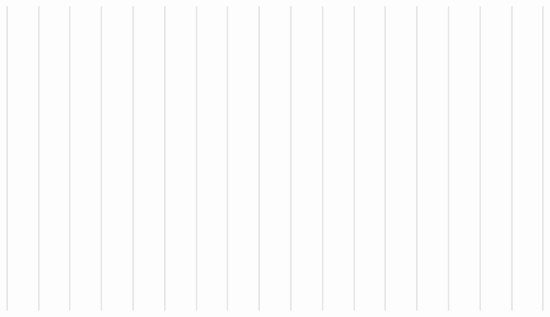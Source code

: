 \documentclass[letterpaper,10pt,english]{sphinxmanual}
\begin{document}
\begin{quote}
\begin{quote}
\begin{quote}
\begin{quote}
\begin{quote}
\begin{quote}
\begin{quote}
\begin{quote}
\begin{quote}
\begin{quote}
\begin{quote}
\begin{quote}
\begin{quote}
\begin{quote}
\begin{quote}
\begin{quote}
\begin{quote}
\begin{quote}
\begin{quote}
\begin{quote}
\begin{quote}
\begin{quote}
\begin{quote}
\begin{quote}
\begin{quote}
\begin{quote}
\begin{quote}
\begin{quote}
\begin{quote}
\begin{quote}
\begin{quote}
\begin{quote}
\begin{quote}
\begin{quote}
\begin{quote}
\begin{quote}
\begin{quote}
\begin{quote}
\begin{quote}
\begin{quote}
\begin{quote}
\begin{quote}
\begin{quote}
\begin{quote}
\begin{quote}
\begin{quote}
\begin{quote}
\begin{quote}
\begin{quote}
\begin{quote}
\begin{quote}
\begin{quote}
\begin{quote}
\begin{quote}
\begin{quote}
\begin{quote}
\begin{quote}
\begin{quote}
\begin{quote}
\begin{quote}
\begin{quote}
\begin{quote}
\begin{quote}
\begin{quote}
\begin{quote}
\begin{quote}
\begin{quote}
\begin{quote}
\begin{quote}
\begin{quote}
\begin{quote}
\begin{quote}
\begin{quote}
\begin{quote}
\begin{quote}
\begin{quote}
\begin{quote}
\begin{quote}
\begin{quote}
\begin{quote}
\begin{quote}
\begin{quote}
\begin{quote}
\begin{quote}
\begin{quote}
\begin{quote}
\begin{quote}
\begin{quote}
\begin{quote}
\begin{quote}
\begin{quote}
\begin{quote}
\begin{quote}
\begin{sphinxShadowBox}
\begin{quote}
\begin{description}
Napolitano}

\end{description}\end{quote}
\end{sphinxShadowBox}

\begin{sphinxShadowBox}
\begin{itemize}
\item {} 
\sphinxAtStartPar
<<<<<<< HEAD
\label{\detokenize{database_schema:id102}}{\hyperref[\detokenize{database_schema:overview-table}]{}}

\item {} 
\sphinxAtStartPar
{}\label{\detokenize{database_schema:id103}}{\hyperref[\detokenize{database_schema:aggressor-table}]{}}

\item {} 
\sphinxAtStartPar
{}\label{\detokenize{database_schema:id104}}{\hyperref[\detokenize{database_schema:victim-table}]{}}

\item {} 
\sphinxAtStartPar
{}\label{\detokenize{database_schema:id105}}{\hyperref[\detokenize{database_schema:human-rights-category-table}]{}}

\item {} 
\sphinxAtStartPar
{}\label{\detokenize{database_schema:id106}}{\hyperref[\detokenize{database_schema:human-rights-offense-table}]{}}

\item {} 
\end{itemize}
\end{sphinxShadowBox}
\end{quote}
\end{quote}
\end{quote}
\end{quote}
\end{quote}
\end{quote}
\end{quote}
\end{quote}
\end{quote}
\end{quote}
\end{quote}
\end{quote}
\end{quote}
\end{quote}
\end{quote}
\end{quote}
\end{quote}
\end{quote}
\end{quote}
\end{quote}
\end{quote}
\end{quote}
\end{quote}
\end{quote}
\end{quote}
\end{quote}
\end{quote}
\end{quote}
\end{quote}
\end{quote}
\end{quote}
\end{quote}
\end{quote}
\end{quote}
\end{quote}
\end{quote}
\end{quote}
\end{quote}
\end{quote}
\end{quote}
\end{quote}
\end{quote}
\end{quote}
\end{quote}
\end{quote}
\end{quote}
\end{quote}
\end{quote}
\end{quote}
\end{quote}
\end{quote}
\end{quote}
\end{quote}
\end{quote}
\end{quote}
\end{quote}
\end{quote}
\end{quote}
\end{quote}
\end{quote}
\end{quote}
\end{quote}
\end{quote}
\end{quote}
\end{quote}
\end{quote}
\end{quote}
\end{quote}
\end{quote}
\end{quote}
\end{quote}
\end{quote}
\end{quote}
\end{quote}
\end{quote}
\end{quote}
\end{quote}
\end{quote}
\end{quote}
\end{quote}
\end{quote}
\end{quote}
\end{quote}
\end{quote}
\end{quote}
\end{quote}
\end{quote}
\end{quote}
\end{quote}
\end{quote}
\end{quote}
\end{quote}
\end{quote}
\end{document}
